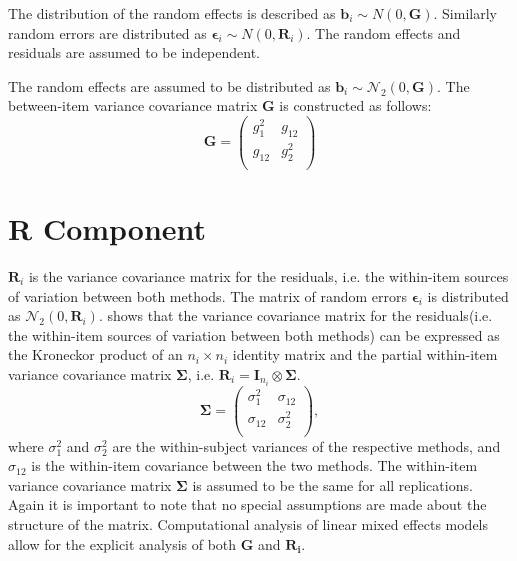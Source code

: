 \documentclass[12pt, a4paper]{report}
\theoremstyle{plain}
\theoremstyle{definition}
\theoremstyle{remark}
\begin{document}
The distribution of the random effects is described as $\boldsymbol{b}_i \sim N(0,\boldsymbol{G})$. Similarly  random errors are distributed as $\boldsymbol{\epsilon}_i \sim N(0,\boldsymbol{R}_i)$. The random effects and residuals are assumed to be independent.



The random effects are assumed to be distributed as $\boldsymbol{b}_i \sim \mathcal{N}_2(0,\boldsymbol{G})$. The between-item variance covariance matrix $\boldsymbol{G}$ is constructed as follows:
\[ \boldsymbol{G} =\left(
\begin{array}{cc}
g^2_1  & g_{12} \\
g_{12} & g^2_2 \\
\end{array}
\right) \]

\section{R Component}


	$\boldsymbol{R}_{i}$ is the variance covariance matrix for the residuals, i.e. the within-item sources of variation between both methods.	
The matrix of random errors $\boldsymbol{\epsilon}_i$ is distributed as $\mathcal{N}_2(0,\boldsymbol{R}_i)$.
\citet{hamlett} shows that the variance covariance matrix for the residuals(i.e. the within-item sources of variation between both methods) can be expressed as the Kroneckor product of an $n_i \times n_i$ identity matrix and the partial within-item variance covariance matrix $\boldsymbol{\Sigma}$, i.e. $\boldsymbol{R}_{i} = \boldsymbol{I}_{n_{i}} \otimes \boldsymbol{\Sigma}$.
\[
\boldsymbol{\Sigma} = \left( \begin{array}{cc}
\sigma^2_{1} & \sigma_{12} \\
\sigma_{12} & \sigma^2_{2} \\
\end{array}\right),
\]
where $\sigma^2_{1}$ and $\sigma^2_{2}$ are the within-subject variances of the respective methods, and $\sigma_{12}$ is the within-item covariance between the two methods. The within-item variance covariance matrix $\boldsymbol{\Sigma}$ is assumed to be the same for all replications.  Again it is important to note that no special assumptions are made about the structure of the matrix. Computational analysis of linear mixed effects models allow for the explicit analysis of both $\boldsymbol{G}$ and $\boldsymbol{R_i}$.
\end{document}
